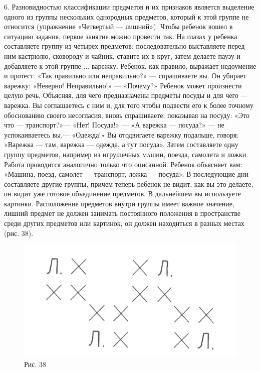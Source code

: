 \documentclass{book}
\begin{document}
6. Разновидностью классификации предметов и их признаков является
выделение одного из группы нескольких однородных предметов, который к
этой группе не относится (упражнение «Четвертый --- лишний»). Чтобы
ребенок вошел в ситуацию задания, первое занятие можно провести так. На
глазах у ребенка составляете группу из четырех предметов:
последовательно выставляете перед ним кастрюлю, сковороду и чайник,
ставите их в круг, затем делаете паузу и добавляете к этой группе ...
варежку. Ребенок, как правило, выражает недоумение и протест. «Так
правильно или неправильно?» --- спрашиваете вы. Он убирает варежку:
«Неверно! Неправильно!» --- «Почему?» Ребенок может произнести целую
речь, Объясняя, для чего предназначены предметы посуды и для чего ---
варежка. Вы соглашаетесь с ним и, для того чтобы подвести его к более
точному обоснованию своего несогласия, вновь спрашиваете, показывая на
посуду: «Это что --- транспорт?»--- «Нет! Посуда!» --- «А варежка ---
посуда?» --- не успокаиваетесь вы.--- «Одежда!» Вы отодвигаете варежку
подальше, говоря: «Варежка --- там, варежка --- одежда, а тут посуда».
Затем составляете одну группу предметов, например из игрушечных
\textsc{ма}шин, поезда, самолета и ложки. Работа проводится аналогично
только что описанной. Ребенок объясняет вам: «Машина, поезд, самолет ---
транспорт, ложка --- посуда». В последующие дни составляете другие
группы, причем теперь ребенок не видит, как вы это делаете, он видит уже
готовое объединение предметов. В дальнейшем вы используете картинки.
Расположение предметов внутри группы имеет важное значение, лишний
предмет не должен занимать постоянного положения в пространстве среди
других предметов или картинок, он должен находиться в разных местах
(рис. 38).

\begin{figure}
\centering
\includegraphics[width=\linewidth]{media/media/image35.png}
\caption*{Рис. 38}
\end{figure}
\end{document}
